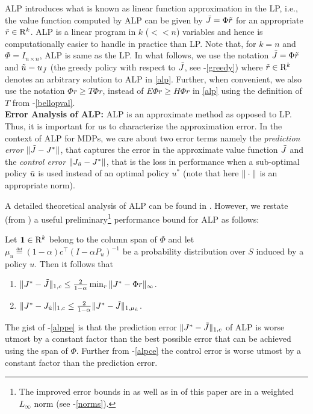 ALP introduces what is known as linear function approximation in the LP, i.e., the value function computed by ALP can be given by $\tilde{J}=\Phi \tilde{r}$ for an appropriate $\tilde{r}\in \mathrm{R}^k$. ALP is a linear program in $k$ ($<<n$) variables and hence is computationally easier to handle in practice than LP. Note that, for $k=n$ and $\Phi=I_{n\times n}$, ALP is same as the LP. In what follows, we use the notation $\tilde{J}=\Phi \tilde{r}$ and $\tilde{u}=u_{\tilde{J}}$ (the greedy policy with respect to $\tilde{J}$, see -\eqref{greedy}) where $\tilde{r}\in\mathrm{R}^k$ denotes an arbitrary solution to ALP in \eqref{alp}. Further, when convenient, we also use the notation $\Phi r \geq T\Phi r$, instead of $E\Phi r\geq H \Phi r$ in \eqref{alp} using the definition of $T$ from -\eqref{bellopval}.\\
\textbf{Error Analysis of ALP:} ALP is an approximate method as opposed to LP. Thus, it is important for us to characterize the approximation error. In the context of ALP for MDPs, we care about two error terms namely the \emph{prediction error} $\|\tilde{J}-J^*\|$, that captures the error in the approximate value function $\tilde{J}$ and the \emph{control error} $\|J_{\tilde{u}}-J^*\|$, that is the loss in performance when a sub-optimal policy $\tilde{u}$ is used instead of an optimal policy $u^*$ (note that here $\|\cdot\|$ is an appropriate norm).\par
A detailed theoretical analysis of ALP can be found in \cite{ALP}. However, we restate (from \cite{ALP}) a useful preliminary\footnote{The improved error bounds in \cite{ALP} as well as in  of this paper are in a weighted $L_\infty$ norm (see -\eqref{norms}).} performance bound for ALP as follows:
\begin{theorem}\label{alpvanilla}
Let $\mathbf{1}\in \mathrm{R}^k$ belong to the column span of $\Phi$ and let $\mu_u\eqdef (1-\alpha)c^\top(I-\alpha P_u)^{-1}$ be a probability distribution over $S$ induced by a policy $u$. Then it follows that
\begin{enumerate}
\item\label{alppe} $\|J^*-\tilde{J}\|_{1,c}\leq \frac{2}{1-\alpha}\min_{r}\|J^*-\Phi r\|_\infty$.
\item\label{alpce} $\|J^*-J_{\tilde{u}}\|_{1,c}\leq \frac{2}{1-\alpha}\|J^*-\tilde{J}\|_{1,\mu_{\tilde{u}}}$.
\end{enumerate}
\end{theorem}
The gist of -\eqref{alppe} is that the prediction error $\|J^*-\tilde{J}\|_{1,c}$ of ALP is worse utmost by a constant factor than the best possible error that can be achieved using the span of $\Phi$. Further from -\eqref{alpce} the control error is worse utmost by a constant factor than the prediction error.\\
